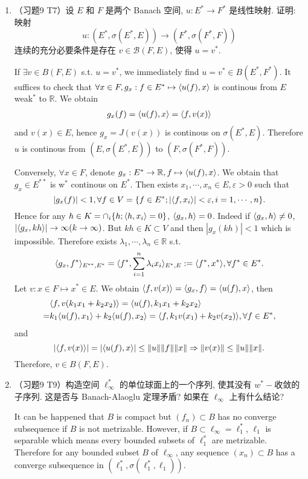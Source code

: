 \begin{enumerate}
  \item （习题9 T7）设 $E$ 和 $F$ 是两个 Banach 空间, $u: E^{*} \rightarrow F^{*}$ 是线性映射. 证明: 映射
    $$
    u:\left(E^{*}, \sigma\left(E^{*}, E\right)\right) \rightarrow\left(F^{*}, \sigma\left(F^{*}, F\right)\right)
    $$
    连续的充分必要条件是存在 $v \in \mathcal{B}(F, E)$, 使得 $u=v^{*}$.
    \begin{answer}
      If $\exists v\in B(F, E)$ s.t. $u = v^*$, we immediately find $u = v^*\in B(E^*, F^*)$. It suffices to check that $\forall x\in F, g_x: f\in E^*\mapsto \langle u(f),x\rangle$ is continous from $E$ weak$^*$ to $\mathbb R$. We obtain
      \[ \begin{aligned}
          g_x(f) = \langle u(f),x\rangle=\langle f,v(x)\rangle
      \end{aligned} \]
      and $v(x)\in E$, hence $g_x = J(v(x))$ is continous on $\sigma(E^*, E)$. Therefore $u$ is continous from $(E, \sigma(E^*, E))$ to $(F, \sigma(F^*, F))$.

      Conversely, $\forall x \in F$, denote $g_x: E^*\to \mathbb R, f\mapsto \langle u(f),x\rangle$. We obtain that $g_x\in E^{**}$ is w$^*$ continous on $E^*$. Then exists $x_1, \cdots, x_n\in E, \varepsilon > 0$ such that
      \[ |g_x(f)| < 1 , \forall f\in V = \{ f\in E^*; |\langle f,x_i\rangle| < \varepsilon , i = 1,\cdots, n \}.  \]
      Hence for any $h\in K = \cap_i \{h; \langle h,x_i\rangle = 0\}$, $\langle g_x,h\rangle= 0$. Indeed if $\langle g_x,h\rangle \neq  0$, $|\langle g_x,kh\rangle|\to \infty(k\to\infty)$. But $kh\in K\subset V$ and then $|g_x(kh)|<1$ which is impossible. Therefore exists $\lambda_1, \cdots, \lambda_n\in \mathbb R$ s.t.
      \[\langle g_x,f^*\rangle_{E^{**}, E^*} = \langle f^*,\sum_{i=1}^n\lambda_i x_i\rangle_{E^*, E}:= \langle f^*,x^*\rangle, \forall f^*\in E^*. \]
      Let $v: x\in F\mapsto x^*\in E$. We obtain $\langle f,v(x)\rangle = \langle g_x,f\rangle = \langle u(f),x\rangle$, then
      \[ \begin{aligned}
          &\langle f,v(k_1x_1 + k_2x_2)\rangle = \langle u(f),k_1x_1 +k_2x_2\rangle\\
          =&k_1\langle u(f),x_1\rangle + k_2\langle u(f),x_2\rangle
          =\langle f,k_1v(x_1) + k_2v(x_2)\rangle, \forall f\in E^*,
      \end{aligned}\]
      and
      \[ |\langle f,v(x)\rangle| = |\langle u(f),x\rangle|\leq \|u\|\|f\|\|x\|\Rightarrow \|v(x)\|\leq \|u\|\|x\|. \]
      Therefore, $v\in B(F, E)$.
    \end{answer}
  \item （习题9 T9）构造空间 $\ell_{\infty}^{*}$ 的单位球面上的一个序列, 使其没有 $w^{*}-$收敛的子序列. 这是否与 Banach-Alaoglu 定理矛盾? 如果在 $\ell_{\infty}$ 上有什么结论?
    \begin{answer}
      It can be happened that $B$ is compact but $(f_n)\subset B$ has no converge subsequence if $B$ is not metrizable. However, if $B\subset \ell_\infty = \ell_1^*$, $\ell_1$ is separable which means every bounded subsets of $\ell_1^*$ are metrizable. Therefore for any bounded subset $B$ of $\ell_\infty$, any sequence $(x_n)\subset B$ has a converge subsequence in $(\ell_1^*, \sigma(\ell_1^*, \ell_1))$.


\end{answer}
\end{enumerate}
